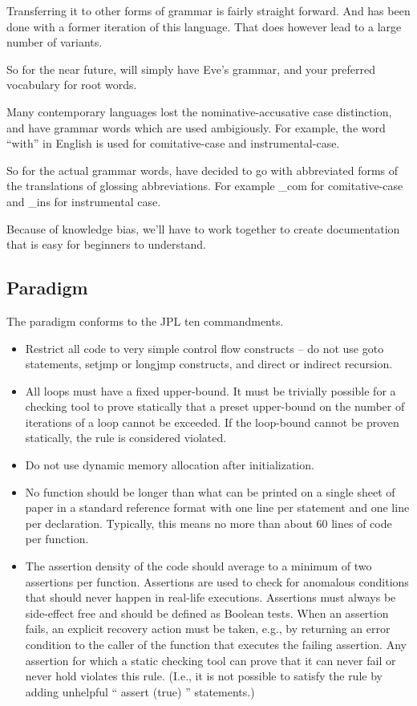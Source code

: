 \begin{multicols}{2}
Transferring it to other forms of grammar is fairly straight forward. And has
been done with a former iteration of this language. That does however lead to a
large number of variants. 

So for the near future, will simply have Eve's grammar, and your preferred
vocabulary for root words.  

Many contemporary languages lost the nominative-accusative case distinction, and
have grammar words which are used ambigiously. For example, the word ``with'' in
English is used for comitative-case and instrumental-case. 

So for the actual grammar words, have decided to go with abbreviated forms of the
translations of glossing abbreviations. For example \_com for comitative-case and
\_ins for instrumental case. 

Because of knowledge bias, we'll have to work together to create documentation 
that is easy for beginners to understand.

\subsection{Paradigm}

The paradigm conforms to the JPL ten
commandments\cite{JPL10}.

\begin{itemize}
\item Restrict all code to very simple control flow constructs – do not use goto
statements, setjmp or longjmp constructs, and direct or indirect 
recursion. 
\item All loops must have a fixed upper-bound. It must be trivially possible for
a checking tool to prove statically that a preset upper-bound on the number of
iterations of a loop cannot be exceeded. If the loop-bound cannot be proven
statically, the rule is considered violated.  
\item Do not use dynamic memory allocation after initialization.  
\item No function should be longer than what can be printed on a single sheet of
paper in a standard reference format with one line per statement and one line
per declaration. Typically, this means no more than about 60 lines of code per
function. 
\item The assertion density of the code should average to a minimum of two
assertions per function. Assertions are used to check for anomalous conditions
that should never happen in real-life executions. Assertions must always be
side-effect free and should be defined as Boolean tests. When an assertion
fails, an explicit recovery action must be taken, e.g., by returning an error
condition to the caller of the function that executes the failing assertion. Any
assertion for which a static checking tool can prove that it can never fail or
never hold violates this rule. (I.e., it is not possible to satisfy the rule by
adding unhelpful `` assert (true) '' statements.)  



\end{itemize}
\end{multicols}
